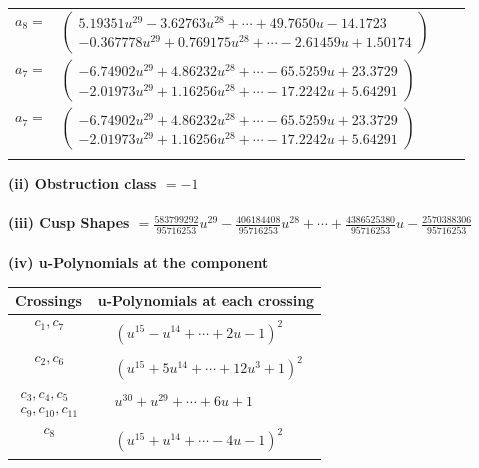 \documentclass[1p]{elsarticle_modified}
\theoremstyle{definition}
\begin{document}
\begin{tabular}{m{7pt} m{180pt} m{7pt} m{180pt} }
\flushright $a_{8}=$&$\begin{pmatrix}5.19351 u^{29}-3.62763 u^{28}+\cdots+49.7650 u-14.1723\\-0.367778 u^{29}+0.769175 u^{28}+\cdots-2.61459 u+1.50174\end{pmatrix}$ \\
\flushright $a_{7}=$&$\begin{pmatrix}-6.74902 u^{29}+4.86232 u^{28}+\cdots-65.5259 u+23.3729\\-2.01973 u^{29}+1.16256 u^{28}+\cdots-17.2242 u+5.64291\end{pmatrix}$\\ \flushright $a_{7}=$&$\begin{pmatrix}-6.74902 u^{29}+4.86232 u^{28}+\cdots-65.5259 u+23.3729\\-2.01973 u^{29}+1.16256 u^{28}+\cdots-17.2242 u+5.64291\end{pmatrix}$\\&\end{tabular}
\flushleft \textbf{(ii) Obstruction class $= -1$}\\~\\
\flushleft \textbf{(iii) Cusp Shapes $= \frac{583799292}{95716253} u^{29}-\frac{406184408}{95716253} u^{28}+\cdots+\frac{4386525380}{95716253} u-\frac{2570388306}{95716253}$}\\~\\
\newpage\renewcommand{\arraystretch}{1}
\flushleft \textbf{(iv) u-Polynomials at the component}\newline \\
\begin{tabular}{m{50pt}|m{274pt}}
Crossings & \hspace{64pt}u-Polynomials at each crossing \\
\hline $$\begin{aligned}c_{1},c_{7}\end{aligned}$$&$\begin{aligned}
&(u^{15}- u^{14}+\cdots+2 u-1)^{2}
\end{aligned}$\\
\hline $$\begin{aligned}c_{2},c_{6}\end{aligned}$$&$\begin{aligned}
&(u^{15}+5 u^{14}+\cdots+12 u^3+1)^{2}
\end{aligned}$\\
\hline $$\begin{aligned}c_{3},c_{4},c_{5}\\c_{9},c_{10},c_{11}\end{aligned}$$&$\begin{aligned}
&u^{30}+u^{29}+\cdots+6 u+1
\end{aligned}$\\
\hline $$\begin{aligned}c_{8}\end{aligned}$$&$\begin{aligned}
&(u^{15}+u^{14}+\cdots-4 u-1)^{2}
\end{aligned}$\\
\hline
\end{tabular}\\~\\
\end{document}
